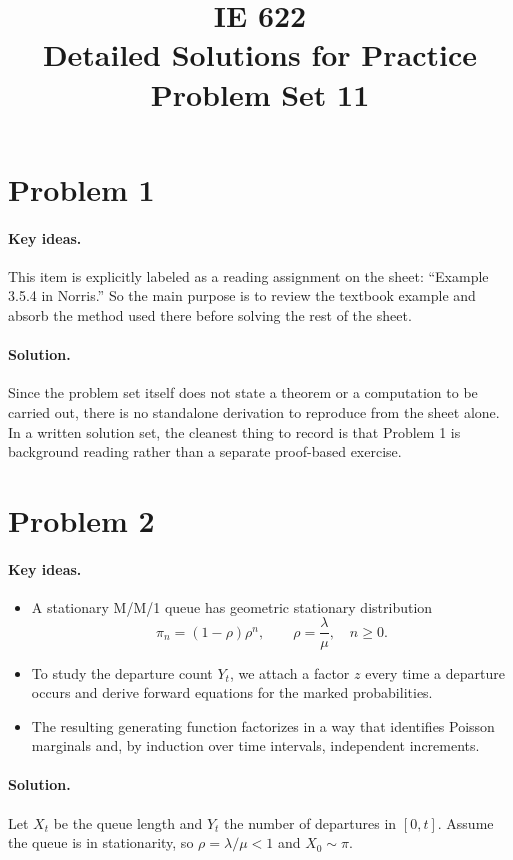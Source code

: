 \documentclass[11pt]{article}
\title{IE 622 \\ Detailed Solutions for Practice Problem Set 11}
\author{}
\date{}
\newcommand{\1}{\mathbf{1}}
\begin{document}
\maketitle

\section*{Problem 1}
\paragraph{Key ideas.}
This item is explicitly labeled as a reading assignment on the sheet: ``Example 3.5.4 in Norris.'' So the main purpose is to review the textbook example and absorb the method used there before solving the rest of the sheet.

\paragraph{Solution.}
Since the problem set itself does not state a theorem or a computation to be carried out, there is no standalone derivation to reproduce from the sheet alone. In a written solution set, the cleanest thing to record is that Problem 1 is background reading rather than a separate proof-based exercise.

\section*{Problem 2}
\paragraph{Key ideas.}
\begin{itemize}
    \item A stationary M/M/1 queue has geometric stationary distribution
    \[
        \pi_n = (1-\rho)\rho^n, \qquad \rho = \frac{\lambda}{\mu}, \quad n \ge 0.
    \]
    \item To study the departure count \(Y_t\), we attach a factor \(z\) every time a departure occurs and derive forward equations for the marked probabilities.
    \item The resulting generating function factorizes in a way that identifies Poisson marginals and, by induction over time intervals, independent increments.
\end{itemize}

\paragraph{Solution.}
Let \(X_t\) be the queue length and \(Y_t\) the number of departures in \([0,t]\). Assume the queue is in stationarity, so \(\rho=\lambda/\mu<1\) and \(X_0 \sim \pi\).
\end{document}
